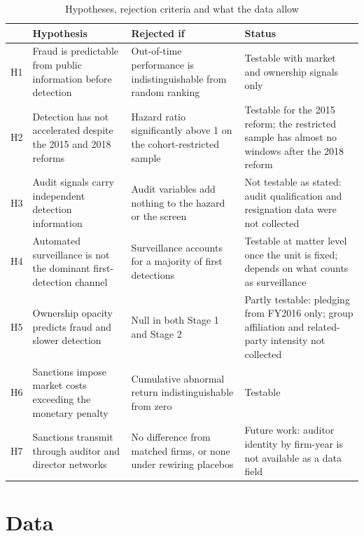 \documentclass[letterpaper,11pt,leqno]{article}
\begin{document}
\begin{table}[t]
\caption{Hypotheses, rejection criteria and what the data allow}
\begin{tabular*}{\textwidth}[]{L{0.6cm}@{\extracolsep\fill}L{4.3cm}L{4.1cm}L{4.4cm}}
\toprule
& Hypothesis & Rejected if & Status \\
\midrule
H1 & Fraud is predictable from public information before detection & Out-of-time performance is indistinguishable from random ranking & Testable with market and ownership signals only \\
H2 & Detection has not accelerated despite the 2015 and 2018 reforms & Hazard ratio significantly above 1 on the cohort-restricted sample & Testable for the 2015 reform; the restricted sample has almost no windows after the 2018 reform \\
H3 & Audit signals carry independent detection information & Audit variables add nothing to the hazard or the screen & Not testable as stated: audit qualification and resignation data were not collected \\
H4 & Automated surveillance is not the dominant first-detection channel & Surveillance accounts for a majority of first detections & Testable at matter level once the unit is fixed; depends on what counts as surveillance \\
H5 & Ownership opacity predicts fraud and slower detection & Null in both Stage 1 and Stage 2 & Partly testable: pledging from FY2016 only; group affiliation and related-party intensity not collected \\
H6 & Sanctions impose market costs exceeding the monetary penalty & Cumulative abnormal return indistinguishable from zero & Testable \\
H7 & Sanctions transmit through auditor and director networks & No difference from matched firms, or none under rewiring placebos & Future work: auditor identity by firm-year is not available as a data field \\
\bottomrule
\end{tabular*}
\label{t:hypotheses}\end{table}

\section{Data}\label{s:data}
\end{document}
